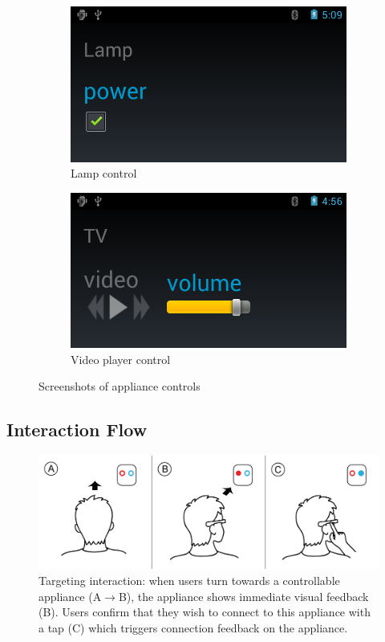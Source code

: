\begin{figure}
\centering
\begin{subfigure}{.5\columnwidth}
  \centering
  \includegraphics[width=0.9\columnwidth]{figures/screenshot_LAMP_CONTROL.png}
  \caption{Lamp control}
  \label{fig:control_lamp}
\end{subfigure}%
\begin{subfigure}{.5\columnwidth}
  \centering
  \includegraphics[width=0.9\columnwidth]{figures/screenshot_TV_CONTROLS.png}
  \caption{Video player control}
  \label{fig:control_tv}
\end{subfigure}
\caption{Screenshots of appliance controls}
\label{fig:test}
\end{figure}

\subsection{Interaction Flow}

\begin{figure}[t!]
\centering
\includegraphics[width=\columnwidth]{figures/stepbystep.png}
\caption{Targeting interaction: when users turn towards a controllable appliance (A$\rightarrow$B), the appliance shows immediate visual feedback (B). Users confirm that they wish to connect to this appliance with a tap (C) which triggers connection feedback on the appliance.}
\label{fig:interaction}
\end{figure}

